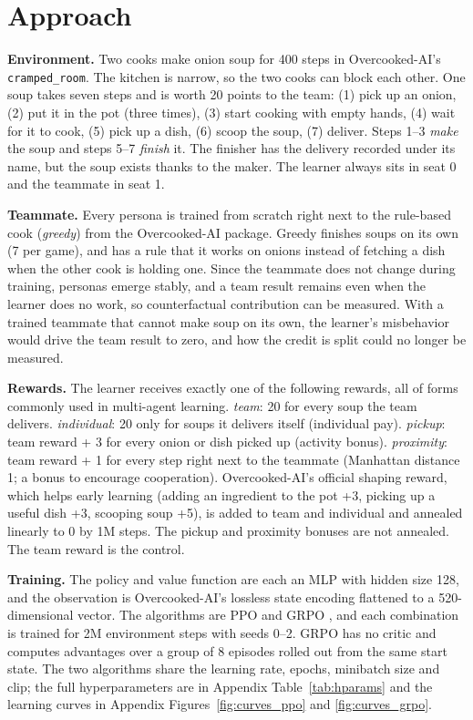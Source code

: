 \documentclass[letterpaper]{article} %
\begin{document}
\section{Approach}
\textbf{Environment.} Two cooks make onion soup for 400 steps in Overcooked-AI's
\texttt{cramped\_room}. The kitchen is narrow, so the two cooks can block each other. One soup takes
seven steps and is worth 20 points to the team: (1) pick up an onion, (2) put it in the pot (three
times), (3) start cooking with empty hands, (4) wait for it to cook, (5) pick up a dish, (6) scoop the
soup, (7) deliver. Steps 1--3 \emph{make} the soup and steps 5--7 \emph{finish} it. The finisher has the
delivery recorded under its name, but the soup exists thanks to the maker. The learner always sits in
seat 0 and the teammate in seat 1.

\textbf{Teammate.} Every persona is trained from scratch right next to the rule-based cook
(\emph{greedy}) from the Overcooked-AI package. Greedy finishes soups on its own (7 per game), and has a
rule that it works on onions instead of fetching a dish when the other cook is holding one. Since the
teammate does not change during training, personas emerge stably, and a team result remains even when
the learner does no work, so counterfactual contribution can be measured. With a trained teammate that
cannot make soup on its own, the learner's misbehavior would drive the team result to zero, and how the
credit is split could no longer be measured.

\textbf{Rewards.} The learner receives exactly one of the following rewards, all of forms commonly used
in multi-agent learning. \emph{team}: 20 for every soup the team delivers. \emph{individual}: 20 only for
soups it delivers itself (individual pay). \emph{pickup}: team reward + 3 for every onion or dish picked
up (activity bonus). \emph{proximity}: team reward + 1 for every step right next to the teammate
(Manhattan distance 1; a bonus to encourage cooperation). Overcooked-AI's official shaping reward, which
helps early learning (adding an ingredient to the pot +3, picking up a useful dish +3, scooping soup +5),
is added to team and individual and annealed linearly to 0 by 1M steps. The pickup and proximity bonuses
are not annealed. The team reward is the control.

\textbf{Training.} The policy and value function are each an MLP with hidden size 128, and the
observation is Overcooked-AI's lossless state encoding flattened to a 520-dimensional vector. The
algorithms are PPO \cite{schulman2017ppo} and GRPO \cite{shao2024deepseekmath}, and each combination is
trained for 2M environment steps with seeds 0--2. GRPO has no critic and computes advantages over a
group of 8 episodes rolled out from the same start state. The two algorithms share the learning rate,
epochs, minibatch size and clip; the full hyperparameters are in Appendix Table~\ref{tab:hparams} and
the learning curves in Appendix Figures~\ref{fig:curves_ppo} and \ref{fig:curves_grpo}.
\end{document}
